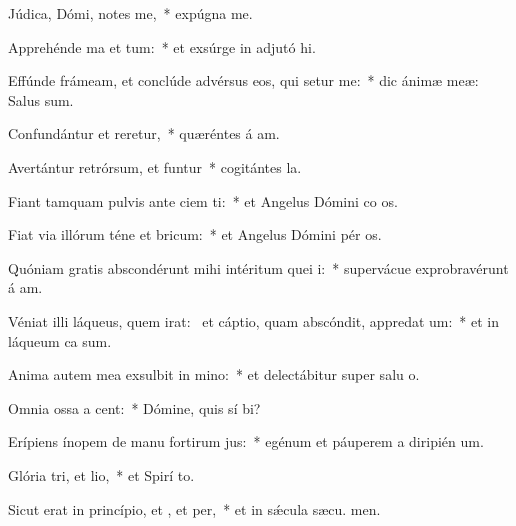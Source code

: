 \item Júdica, Dómi, notes me,~* expúgna  me.
\item Apprehénde ma et tum:~* et exsúrge in adjutó hi.
\item Effúnde frámeam, et conclúde advérsus eos, qui setur me:~* dic ánimæ meæ: Salus   sum.
\item Confundántur et reretur,~* quæréntes á am.
\item Avertántur retrórsum, et funtur~* cogitántes  la.
\item Fiant tamquam pulvis ante ciem ti:~* et Angelus Dómini co os.
\item Fiat via illórum téne et bricum:~* et Angelus Dómini pér os.
\item Quóniam gratis abscondérunt mihi intéritum quei i:~* supervácue exprobravérunt á am.
\item Véniat illi láqueus, quem irat:~\pscross{} et cáptio, quam abscóndit, appredat um:~* et in láqueum ca  sum.
\item Anima autem mea exsulbit in mino:~* et delectábitur super salu o.
\item Omnia ossa a cent:~* Dómine, quis sí bi?
\item Erípiens ínopem de manu fortirum jus:~* egénum et páuperem a diripién um.
\item Glória tri, et lio,~* et Spirí to.
\item Sicut erat in princípio, et , et per,~* et in sǽcula sæcu. men.
